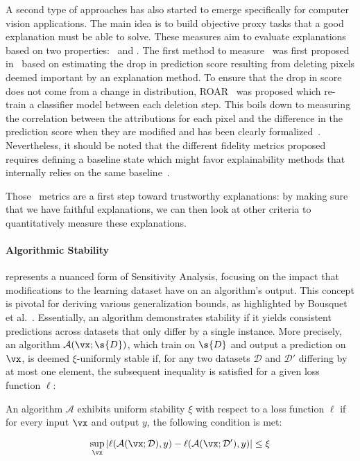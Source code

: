 A second type of approaches has also started to emerge specifically for computer vision applications. The main idea is to build objective proxy tasks that a good explanation must be able to solve.
These measures aim to evaluate explanations based on two properties: \fidelity~and \stability. The first method to measure \fidelity~was first proposed in~\cite{samek2015evaluating} based on estimating the drop in prediction score resulting from deleting pixels deemed important by an explanation method. To ensure that the drop in score does not come from a change in distribution, ROAR~\cite{hooker2018benchmark} was proposed which re-train a classifier model between each deletion step. This boils down to measuring the correlation between the attributions for each pixel and the difference in the prediction score when they are modified and has been clearly formalized~\cite{yeh2019infidelity, aggregating2020, rieger2020irof}.
Nevertheless, it should be noted that the different fidelity metrics proposed requires defining a baseline state which might favor explainability methods that internally relies on the same baseline~\cite{sturmfels2020visualizing}.

Those \fidelity~metrics are a first step toward trustworthy explanations: by making sure that we have faithful explanations, we can then look at other criteria to quantitatively measure these explanations. 

\paragraph{Algorithmic Stability} represents a nuanced form of Sensitivity Analysis, focusing on the impact that modifications to the learning dataset have on an algorithm's output. This concept is pivotal for deriving various generalization bounds, as highlighted by Bousquet et al.~\cite{bousquet2002stability}. Essentially, an algorithm demonstrates stability if it yields consistent predictions across datasets that only differ by a single instance. More precisely, an algorithm $\mathcal{A}(\vx ; \s{D})$, which train on $\s{D}$ and output a prediction on $\vx$, is deemed $\xi$-uniformly stable if, for any two datasets $\mathcal{D}$ and $\mathcal{D}'$ differing by at most one element, the subsequent inequality is satisfied for a given loss function $\ell$:

\begin{definition} An algorithm $\mathcal{A}$ exhibits uniform stability $\xi$ with respect to a loss function $\ell$ if for every input $\vx$ and output $y$, the following condition is met:

\begin{equation}
\sup_{\vx} \left| \ell(\mathcal{A}(\vx; \mathcal{D}), y) - \ell(\mathcal{A}(\vx; \mathcal{D}'), y) \right| \leq \xi
\end{equation}

\end{definition}

